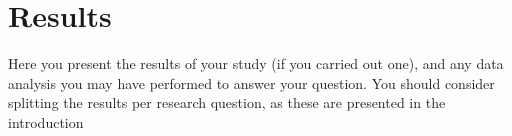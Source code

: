 \chapter{Results}
\label{sec:Results}

Here you present the results of your study (if you carried out one), and any data analysis you may have performed to answer your question.
You should consider splitting the results per research question, as these are presented in the introduction
